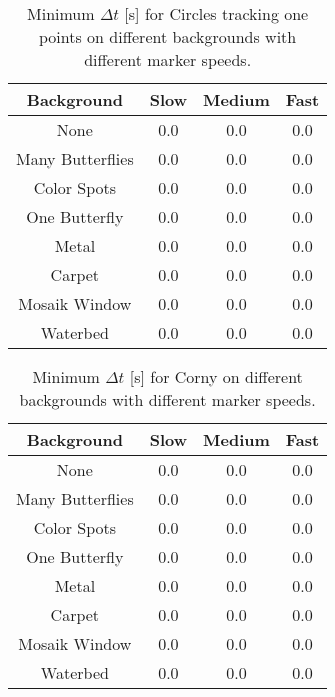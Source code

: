 \begin{table}[H]
\center
\begin{tabular}{|c|c|c|c|}
\hline
Background & Slow & Medium & Fast \\ \hline
None & 0.0 & 0.0 & 0.0 \\ \hline
Many Butterflies & 0.0 & 0.0 & 0.0 \\ \hline
Color Spots & 0.0 & 0.0 & 0.0 \\ \hline
One Butterfly & 0.0 & 0.0 & 0.0 \\ \hline
Metal & 0.0 & 0.0 & 0.0 \\ \hline
Carpet & 0.0 & 0.0 & 0.0 \\ \hline
Mosaik Window & 0.0 & 0.0 & 0.0 \\ \hline
Waterbed & 0.0 & 0.0 & 0.0 \\ \hline
\end{tabular}
\caption{Minimum $\Delta t$ [s] for Circles tracking one points on different backgrounds with different marker speeds.}
\label{tb:min_dt_circles_center}
\end{table}

\begin{table}[H]
\center
\begin{tabular}{|c|c|c|c|}
\hline
Background & Slow & Medium & Fast \\ \hline
None & 0.0 & 0.0 & 0.0 \\ \hline
Many Butterflies & 0.0 & 0.0 & 0.0 \\ \hline
Color Spots & 0.0 & 0.0 & 0.0 \\ \hline
One Butterfly & 0.0 & 0.0 & 0.0 \\ \hline
Metal & 0.0 & 0.0 & 0.0 \\ \hline
Carpet & 0.0 & 0.0 & 0.0 \\ \hline
Mosaik Window & 0.0 & 0.0 & 0.0 \\ \hline
Waterbed & 0.0 & 0.0 & 0.0 \\ \hline
\end{tabular}
\caption{Minimum $\Delta t$ [s] for Corny on different backgrounds with different marker speeds.}
\label{tb:min_dt_corny}
\end{table}
